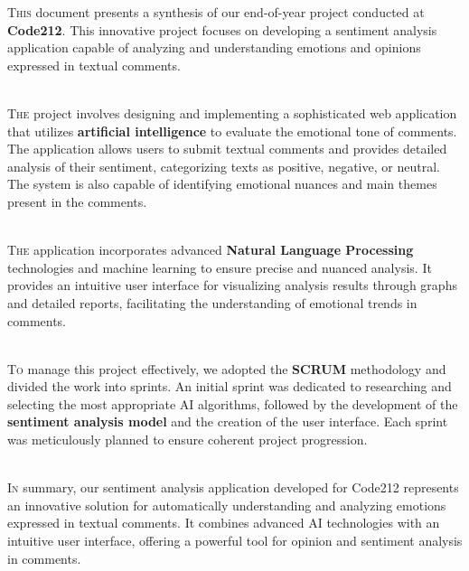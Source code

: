
\lettrine[nindent=0em, slope=.5em] {\color{Eblue}T}{his} document presents a synthesis of our end-of-year project conducted at \textbf{Code212}. This innovative project focuses on developing a sentiment analysis application capable of analyzing and understanding emotions and opinions expressed in textual comments.

\ \\

\lettrine[nindent=0em, slope=.5em] {\color{Eblue}T}{he} project involves designing and implementing a sophisticated web application that utilizes \textbf{artificial intelligence} to evaluate the emotional tone of comments. The application allows users to submit textual comments and provides detailed analysis of their sentiment, categorizing texts as positive, negative, or neutral. The system is also capable of identifying emotional nuances and main themes present in the comments.

\ \\

\lettrine[nindent=0em, slope=.5em] {\color{Eblue}T}{he} application incorporates advanced \textbf{Natural Language Processing} technologies and machine learning to ensure precise and nuanced analysis. It provides an intuitive user interface for visualizing analysis results through graphs and detailed reports, facilitating the understanding of emotional trends in comments.

\ \\

\lettrine[nindent=0em, slope=.5em] {\color{Eblue}T}{o} manage this project effectively, we adopted the \textbf{SCRUM} methodology and divided the work into sprints. An initial sprint was dedicated to researching and selecting the most appropriate AI algorithms, followed by the development of the \textbf{sentiment analysis model} and the creation of the user interface. Each sprint was meticulously planned to ensure coherent project progression.

\ \\

\lettrine[nindent=0em, slope=.5em] {\color{Eblue}I}{n} summary, our sentiment analysis application developed for Code212 represents an innovative solution for automatically understanding and analyzing emotions expressed in textual comments. It combines advanced AI technologies with an intuitive user interface, offering a powerful tool for opinion and sentiment analysis in comments.
